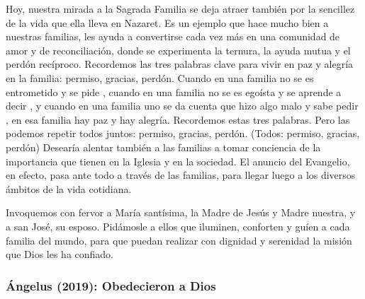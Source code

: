\begin{body}
					Hoy, nuestra mirada a la Sagrada Familia se deja atraer también por la sencillez de la vida que ella lleva en Nazaret. Es un ejemplo que hace mucho bien a nuestras familias, les ayuda a convertirse cada vez más en una comunidad de amor y de reconciliación, donde se experimenta la ternura, la ayuda mutua y el perdón recíproco. Recordemos las tres palabras clave para vivir en paz y alegría en la familia: permiso, gracias, perdón. Cuando en una familia no se es entrometido y se pide , cuando en una familia no se es egoísta y se aprende a decir , y cuando en una familia uno se da cuenta que hizo algo malo y sabe pedir , en esa familia hay paz y hay alegría. Recordemos estas tres palabras. Pero las podemos repetir todos juntos: permiso, gracias, perdón. (Todos: permiso, gracias, perdón) Desearía alentar también a las familias a tomar conciencia de la importancia que tienen en la Iglesia y en la sociedad. El anuncio del Evangelio, en efecto, pasa ante todo a través de las familias, para llegar luego a los diversos ámbitos de la vida cotidiana.
					
					Invoquemos con fervor a María santísima, la Madre de Jesús y Madre nuestra, y a san José, su esposo. Pidámosle a ellos que iluminen, conforten y guíen a cada familia del mundo, para que puedan realizar con dignidad y serenidad la misión que Dios les ha confiado.
				\end{body}
			
			\subsubsection{Ángelus (2019): Obedecieron a Dios}
			
				
